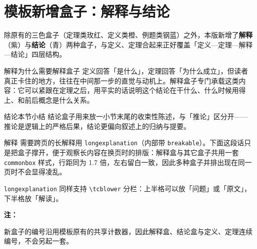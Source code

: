 \documentclass[a4paper,12pt,oneside,fontset=none]{ctexbook}
\newenvironment{explanation}[1][]{\begin{expBox}{解释}{#1}}{\end{expBox}}
\newenvironment{longexplanation}[1][]{\begin{longexpBox}{解释}{#1}}{\end{longexpBox}}
\newenvironment{conclusion}[1][]{\begin{conclBox}{结论}{#1}}{\end{conclBox}}
\newenvironment{note}{
    \par\vspace{0.5em}\noindent
    \textbf{\color{NoteColor} 注：}
}{
    \par\vspace{0.5em}
}
\numberwithin{equation}{chapter}
\begin{document}
\chapter{模板新增盒子：解释与结论}

除原有的三色盒子（定理类玫红、定义类橙、例题类钢蓝）之外，本版新增了\textbf{解释}（紫）与\textbf{结论}（青）两种盒子，与定义、定理合起来正好覆盖「定义—定理—解释—结论」四层结构。

\begin{explanation}[为什么需要解释盒子]
定义回答「是什么」，定理回答「为什么成立」，但读者真正卡住的地方，往往在中间那一步的直觉与动机上。解释盒子专门承载这类内容：它可以紧跟在定理之后，用平实的话说明这个结论在干什么、什么时候用得上、和前后概念是什么关系。
\end{explanation}

\begin{conclusion}[本节小结]
结论盒子用来放一小节末尾的收束性陈述，与「推论」区分开——推论是逻辑上的严格后果，结论更偏向叙述上的归纳与提要。
\end{conclusion}

\begin{longexplanation}
需要跨页的长解释用 \texttt{longexplanation}（内部带 \texttt{breakable}）。下面这段话只是把盒子撑开，便于观察长内容在换页时的排版：解释盒与其它盒子共用一套 \texttt{commonbox} 样式，行距同为 1.7 倍，左右留白一致，因此多种盒子并排出现在同一页时不会显得凌乱。

\tcblower

\texttt{longexplanation} 同样支持 \texttt{\textbackslash tcblower} 分栏：上半格可以放「问题」或「原文」，下半格放「解读」。
\end{longexplanation}

\begin{note}
新盒子的编号沿用模板原有的共享计数器，因此解释盒、结论盒与定义、定理连续编号，不会另起一套。
\end{note}
\end{document}
